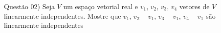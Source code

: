 
\noindent \textcolor{COLOR1}{Questão 02)} Seja $V$ um espaço vetorial real e $v_1$, $v_2$, $v_3$, $v_4$ vetores de $V$ linearmente independentes. Mostre que $v_1$, $v_2-v_1$, $v_3-v_1$, $v_4-v_1$ são linearmente independentes
\\
